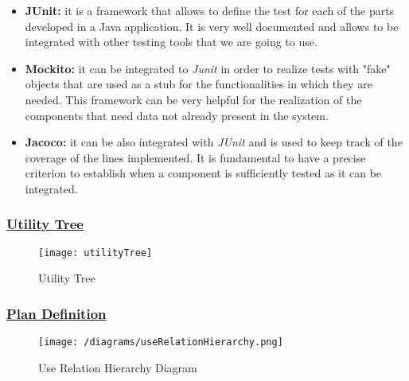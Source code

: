 		\begin{itemize}
			\item \textbf{JUnit:} it is a framework that allows to define the test for each of the parts developed in a Java application. It is very well documented and allows to be integrated with other testing tools that we are going to use.
			
			\item \textbf{Mockito:} it can be integrated to \emph{Junit} in order to realize tests with "fake" objects that are used as a stub for the functionalities in which they are needed. This framework can be very helpful for the realization of the components that need data not already present in the system.
			
			\item \textbf{Jacoco:} it can be also integrated with \emph{JUnit} and is used to keep track of the coverage of the lines implemented. It is fundamental to have a precise criterion to establish when a component is sufficiently tested as it can be integrated.
		\end{itemize} 
		
	\subsubsection[Utility Tree]{\hyperlink{toc}{Utility Tree}}
		\label{sec:utilityTree}
		
		\begin{figure}[h!]
			\centering
			\texttt{[image: utilityTree]}
			\caption{\label{fig:utilityTree} Utility Tree}
		\end{figure}
		
	\subsubsection[Plan Definition]{\hyperlink{toc}{Plan Definition}}
		\label{sec:planDefinition}
		
		\begin{figure}[h!]
			\centering
			\texttt{[image: /diagrams/useRelationHierarchy.png]}
			\caption{\label{fig:useRelationHierarchy} Use Relation Hierarchy Diagram}
		\end{figure}
	
